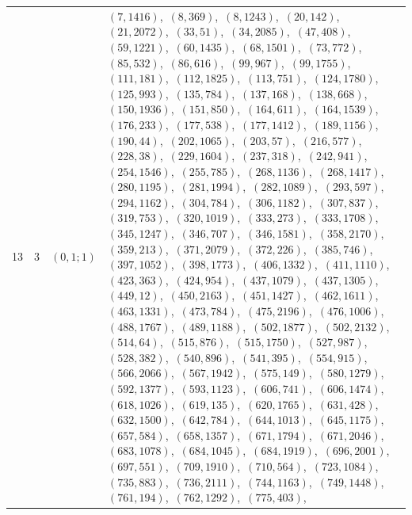 \documentclass[11pt]{article}
\begin{document}
\begin{longtable}{@{}rrl>{\raggedright\arraybackslash}p{}@{}}
13 & 3 & $(0,1;1)$ & $(7,1416)$,\allowbreak\ $(8,369)$,\allowbreak\ $(8,1243)$,\allowbreak\ $(20,142)$,\allowbreak\ $(21,2072)$,\allowbreak\ $(33,51)$,\allowbreak\ $(34,2085)$,\allowbreak\ $(47,408)$,\allowbreak\ $(59,1221)$,\allowbreak\ $(60,1435)$,\allowbreak\ $(68,1501)$,\allowbreak\ $(73,772)$,\allowbreak\ $(85,532)$,\allowbreak\ $(86,616)$,\allowbreak\ $(99,967)$,\allowbreak\ $(99,1755)$,\allowbreak\ $(111,181)$,\allowbreak\ $(112,1825)$,\allowbreak\ $(113,751)$,\allowbreak\ $(124,1780)$,\allowbreak\ $(125,993)$,\allowbreak\ $(135,784)$,\allowbreak\ $(137,168)$,\allowbreak\ $(138,668)$,\allowbreak\ $(150,1936)$,\allowbreak\ $(151,850)$,\allowbreak\ $(164,611)$,\allowbreak\ $(164,1539)$,\allowbreak\ $(176,233)$,\allowbreak\ $(177,538)$,\allowbreak\ $(177,1412)$,\allowbreak\ $(189,1156)$,\allowbreak\ $(190,44)$,\allowbreak\ $(202,1065)$,\allowbreak\ $(203,57)$,\allowbreak\ $(216,577)$,\allowbreak\ $(228,38)$,\allowbreak\ $(229,1604)$,\allowbreak\ $(237,318)$,\allowbreak\ $(242,941)$,\allowbreak\ $(254,1546)$,\allowbreak\ $(255,785)$,\allowbreak\ $(268,1136)$,\allowbreak\ $(268,1417)$,\allowbreak\ $(280,1195)$,\allowbreak\ $(281,1994)$,\allowbreak\ $(282,1089)$,\allowbreak\ $(293,597)$,\allowbreak\ $(294,1162)$,\allowbreak\ $(304,784)$,\allowbreak\ $(306,1182)$,\allowbreak\ $(307,837)$,\allowbreak\ $(319,753)$,\allowbreak\ $(320,1019)$,\allowbreak\ $(333,273)$,\allowbreak\ $(333,1708)$,\allowbreak\ $(345,1247)$,\allowbreak\ $(346,707)$,\allowbreak\ $(346,1581)$,\allowbreak\ $(358,2170)$,\allowbreak\ $(359,213)$,\allowbreak\ $(371,2079)$,\allowbreak\ $(372,226)$,\allowbreak\ $(385,746)$,\allowbreak\ $(397,1052)$,\allowbreak\ $(398,1773)$,\allowbreak\ $(406,1332)$,\allowbreak\ $(411,1110)$,\allowbreak\ $(423,363)$,\allowbreak\ $(424,954)$,\allowbreak\ $(437,1079)$,\allowbreak\ $(437,1305)$,\allowbreak\ $(449,12)$,\allowbreak\ $(450,2163)$,\allowbreak\ $(451,1427)$,\allowbreak\ $(462,1611)$,\allowbreak\ $(463,1331)$,\allowbreak\ $(473,784)$,\allowbreak\ $(475,2196)$,\allowbreak\ $(476,1006)$,\allowbreak\ $(488,1767)$,\allowbreak\ $(489,1188)$,\allowbreak\ $(502,1877)$,\allowbreak\ $(502,2132)$,\allowbreak\ $(514,64)$,\allowbreak\ $(515,876)$,\allowbreak\ $(515,1750)$,\allowbreak\ $(527,987)$,\allowbreak\ $(528,382)$,\allowbreak\ $(540,896)$,\allowbreak\ $(541,395)$,\allowbreak\ $(554,915)$,\allowbreak\ $(566,2066)$,\allowbreak\ $(567,1942)$,\allowbreak\ $(575,149)$,\allowbreak\ $(580,1279)$,\allowbreak\ $(592,1377)$,\allowbreak\ $(593,1123)$,\allowbreak\ $(606,741)$,\allowbreak\ $(606,1474)$,\allowbreak\ $(618,1026)$,\allowbreak\ $(619,135)$,\allowbreak\ $(620,1765)$,\allowbreak\ $(631,428)$,\allowbreak\ $(632,1500)$,\allowbreak\ $(642,784)$,\allowbreak\ $(644,1013)$,\allowbreak\ $(645,1175)$,\allowbreak\ $(657,584)$,\allowbreak\ $(658,1357)$,\allowbreak\ $(671,1794)$,\allowbreak\ $(671,2046)$,\allowbreak\ $(683,1078)$,\allowbreak\ $(684,1045)$,\allowbreak\ $(684,1919)$,\allowbreak\ $(696,2001)$,\allowbreak\ $(697,551)$,\allowbreak\ $(709,1910)$,\allowbreak\ $(710,564)$,\allowbreak\ $(723,1084)$,\allowbreak\ $(735,883)$,\allowbreak\ $(736,2111)$,\allowbreak\ $(744,1163)$,\allowbreak\ $(749,1448)$,\allowbreak\ $(761,194)$,\allowbreak\ $(762,1292)$,\allowbreak\ $(775,403)$,\allowbreak\ 
\end{longtable}
\end{document}
